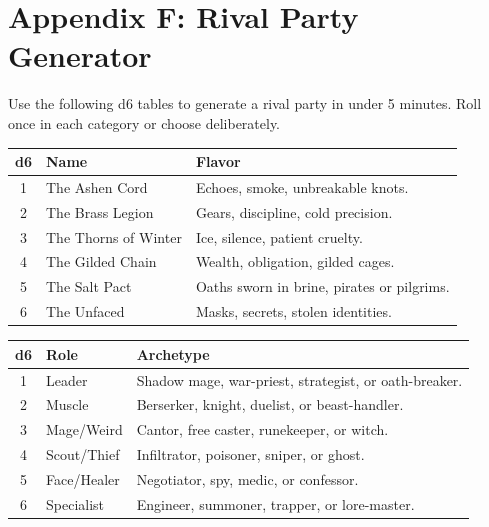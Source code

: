 
\clearpage
\section*{Appendix F: Rival Party Generator}
\label{app:rival-generator}

Use the following d6 tables to generate a rival party in under 5 minutes. Roll once in each category or choose deliberately.

\begin{tcolorbox}[title=Rival Party Name, colback=white!97!gray, colframe=black!80!gray,breakable]
\centering
\setlength{\tabcolsep}{6pt}
\begin{tabular}{cll}
\toprule
\textbf{d6} & \textbf{Name} & \textbf{Flavor} \\
\midrule
1 & The Ashen Cord & Echoes, smoke, unbreakable knots. \\
2 & The Brass Legion & Gears, discipline, cold precision. \\
3 & The Thorns of Winter & Ice, silence, patient cruelty. \\
4 & The Gilded Chain & Wealth, obligation, gilded cages. \\
5 & The Salt Pact & Oaths sworn in brine, pirates or pilgrims. \\
6 & The Unfaced & Masks, secrets, stolen identities. \\
\bottomrule
\end{tabular}
\end{tcolorbox}

\begin{tcolorbox}[title=Composition (3--5 members), colback=white!97!gray, colframe=black!80!gray,breakable]
\centering
\begin{tabular}{cll}
\toprule
\textbf{d6} & \textbf{Role} & \textbf{Archetype} \\
\midrule
1 & Leader & Shadow mage, war-priest, strategist, or oath-breaker. \\
2 & Muscle & Berserker, knight, duelist, or beast-handler. \\
3 & Mage/Weird & Cantor, free caster, runekeeper, or witch. \\
4 & Scout/Thief & Infiltrator, poisoner, sniper, or ghost. \\
5 & Face/Healer & Negotiator, spy, medic, or confessor. \\
6 & Specialist & Engineer, summoner, trapper, or lore-master. \\
\bottomrule
\end{tabular}
\end{tcolorbox}

